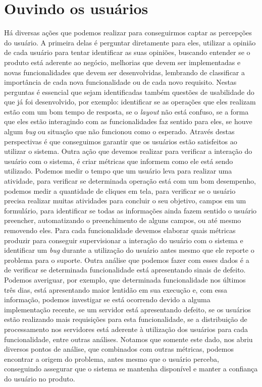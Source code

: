     \section{Ouvindo os usuários}
      Há diversas ações que podemos realizar para conseguirmos captar as percepções
      do usuário. A primeira delas é perguntar diretamente para eles, utilizar
      a opinião de cada usuário para tentar identificar as suas opiniões, buscando
      entender se o produto está aderente ao negócio, melhorias que devem ser
      implementadas e novas funcionalidades que devem ser desenvolvidas,
      lembrando de classificar a importância de cada nova funcionalidade ou de
      cada novo requisito. Nestas perguntas é essencial que sejam identificadas
      também questões de usabilidade do que já foi desenvolvido, por exemplo:
      identificar se as operações que eles realizam estão com um bom tempo de
      resposta, se o \textit{layout} não está confuso, se a forma que eles estão
      interagindo com as funcionalidades faz sentido para eles, se houve algum
      \textit{bug} ou situação que não funcionou como o esperado. Através destas
      perspectivas é que conseguimos garantir que os usuários estão satisfeitos
      ao utilizar o sistema. \newline
      Outra ação que devemos realizar para verificar a interação do usuário com o
      sistema, é criar métricas que informem como ele está sendo utilizado. Podemos
      medir o tempo que um usuário leva para realizar uma atividade, para verificar
      se determinada operação está com um bom desempenho, podemos medir a quantidade de
      cliques em tela, para verificar se o usuário precisa realizar muitas atividades
      para concluir o seu objetivo, campos em um formulário, para identificar se
      todas as informações ainda fazem sentido o usuário preencher, automatizando
      o preenchimento de alguns campos, ou até mesmo removendo eles. Para cada
      funcionalidade devemos elaborar quais métricas produzir para conseguir
      supervisionar a interação do usuário com o sistema e identificar um \textit{bug}
      durante a utilização do usuário antes mesmo que ele reporte o problema para
      o suporte. Outra análise que podemos fazer com esses dados é a de verificar
      se determinada funcionalidade está apresentando sinais de defeito. Podemos
      averiguar, por exemplo, que determinada funcionalidade nos últimos três dias,
      está apresentando maior lentidão em sua execução e, com essa informação, podemos
      investigar se está ocorrendo devido a alguma implementação recente, se um
      servidor está apresentando defeito, se os usuários estão realizando mais
      requisições para esta funcionalidade, se a distribuição de processamento nos
      servidores está aderente à utilização dos usuários para cada funcionalidade,
      entre outras análises. Notamos que somente este dado, nos abriu diversos pontos
      de análise, que combinados com outras métricas, podemos encontrar a origem
      do problema, antes mesmo que o usuário perceba, conseguindo assegurar que
      o sistema se mantenha disponível e manter a confiança do usuário no produto.

